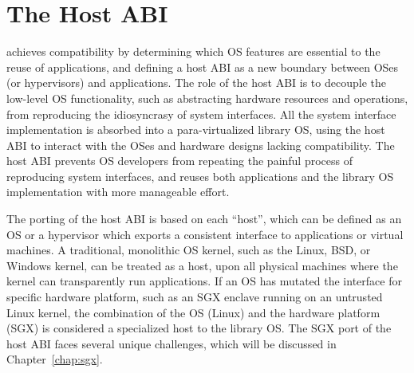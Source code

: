 \section{The Host ABI}
\label{sec:overview:host}


\graphene{} achieves compatibility by determining which OS features
are essential to the reuse of applications, and defining a host ABI as a new boundary between OSes (or hypervisors) and applications.
The role of the host ABI is to decouple the low-level OS functionality, such as abstracting hardware resources and operations, from reproducing the idiosyncrasy of system interfaces. 
All the system interface implementation is absorbed
into a para-virtualized library OS,
using the host ABI to interact with the OSes and hardware designs
lacking compatibility.
The host ABI prevents OS developers
from repeating the painful process of reproducing system interfaces,
and reuses both applications and the library OS implementation with more manageable effort.


 






The porting of the host ABI is based on each ``host'', which can be defined as an OS or a hypervisor which exports a consistent interface to applications or virtual machines.
A traditional, monolithic OS kernel, such as the Linux, BSD, or Windows kernel, can be treated as a host, upon all physical machines where the kernel can transparently run applications.
If an OS has mutated the interface for specific hardware platform,
such as an SGX enclave 
running on an untrusted Linux kernel,
the combination of the OS (Linux) and the hardware platform (SGX) is considered a specialized host to the library OS.
The SGX port of the host ABI faces several unique challenges,
which will be discussed in Chapter~\ref{chap:sgx}.


